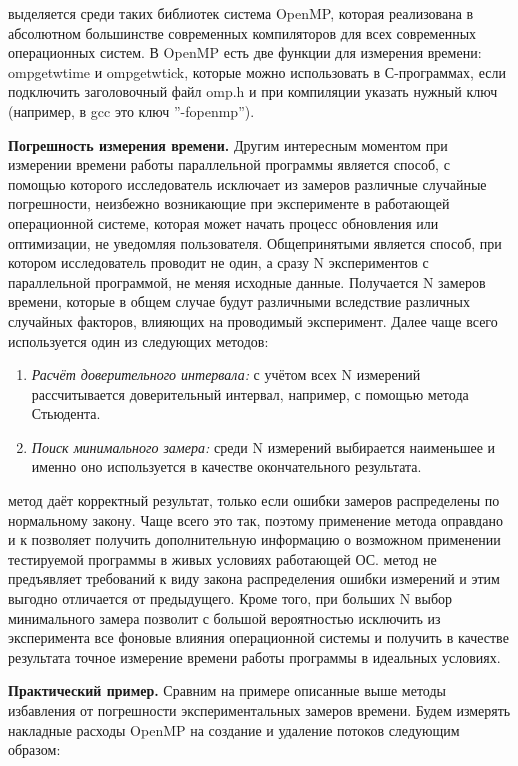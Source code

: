 {	 выделяется среди таких библиотек система OpenMP, которая реализована в абсолютном большинстве современных компиляторов для всех современных операционных систем. В OpenMP есть две функции для измерения времени: omp\textunderscore get\textunderscore wtime и omp\textunderscore get\textunderscore wtick, которые можно использовать в С-программах, если подключить заголовочный файл omp.h и при компиляции указать нужный ключ (например, в gcc это ключ ''-fopenmp'').
	\par\textbf{Погрешность измерения времени.} Другим интересным моментом при измерении времени работы параллельной программы является способ, с помощью которого исследователь исключает из замеров различные случайные погрешности, неизбежно возникающие при эксперименте в работающей операционной системе, которая может начать процесс обновления или оптимизации, не уведомляя пользователя. Общепринятыми является способ, при котором исследователь проводит не один, а сразу N экспериментов с параллельной программой, не меняя исходные данные. Получается N замеров времени, которые в общем случае будут различными вследствие различных случайных факторов, влияющих на проводимый эксперимент. Далее чаще всего используется один из следующих методов:
	\begin{enumerate}
		\item\textit{Расчёт доверительного интервала:} с учётом всех N измерений рассчитывается доверительный интервал, например, с помощью метода Стьюдента.
		\item\textit{Поиск минимального замера:} среди N измерений выбирается наименьшее и именно оно используется в качестве окончательного результата.
	\end{enumerate}
	 метод даёт корректный результат, только если ошибки замеров распределены по нормальному закону. Чаще всего это так, поэтому применение метода оправдано и к позволяет получить дополнительную информацию о возможном применении тестируемой программы в живых условиях работающей ОС.
	 метод не предъявляет требований к виду закона распределения ошибки измерений и этим выгодно отличается от предыдущего. Кроме того, при больших N выбор минимального замера позволит с большой вероятностью исключить из эксперимента все фоновые влияния операционной системы и получить в качестве результата точное измерение времени работы программы в идеальных условиях. 
	\par\textbf{Практический пример.} Сравним на примере описанные выше методы избавления от погрешности экспериментальных замеров времени. Будем измерять накладные расходы OpenMP на создание и удаление потоков следующим образом:
}
